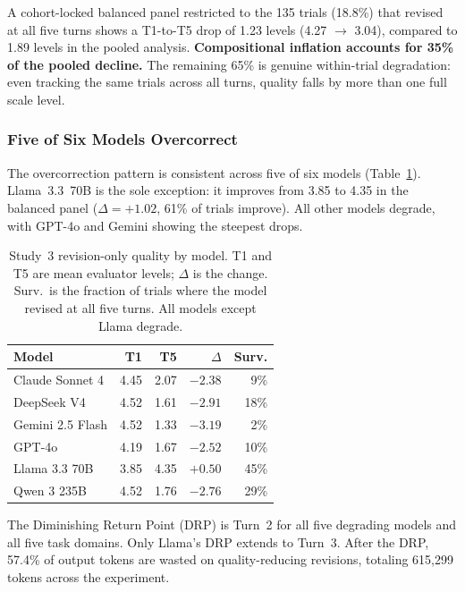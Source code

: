 A cohort-locked balanced panel restricted to the 135 trials (18.8\%) that revised at all five turns shows a T1-to-T5 drop of 1.23 levels (4.27 $\to$ 3.04), compared to 1.89 levels in the pooled analysis. \textbf{Compositional inflation accounts for 35\% of the pooled decline.} The remaining 65\% is genuine within-trial degradation: even tracking the same trials across all turns, quality falls by more than one full scale level.

\subsubsection{Five of Six Models Overcorrect}

The overcorrection pattern is consistent across five of six models (Table~\ref{tab:s3-model-comparison}). Llama~3.3~70B is the sole exception: it improves from 3.85 to 4.35 in the balanced panel ($\Delta = +1.02$, 61\% of trials improve). All other models degrade, with GPT-4o and Gemini showing the steepest drops.

\begin{table}[t]
\centering
\small
\begin{tabular}{@{}lrrrr@{}}
\toprule
\textbf{Model} & \textbf{T1} & \textbf{T5} & \textbf{$\Delta$} & \textbf{Surv.} \\
\midrule
Claude Sonnet 4 & 4.45 & 2.07 & $-2.38$ & 9\% \\
DeepSeek V4 & 4.52 & 1.61 & $-2.91$ & 18\% \\
Gemini 2.5 Flash & 4.52 & 1.33 & $-3.19$ & 2\% \\
GPT-4o & 4.19 & 1.67 & $-2.52$ & 10\% \\
Llama 3.3 70B & 3.85 & 4.35 & $+0.50$ & 45\% \\
Qwen 3 235B & 4.52 & 1.76 & $-2.76$ & 29\% \\
\bottomrule
\end{tabular}
\caption{Study~3 revision-only quality by model. T1 and T5 are mean evaluator levels; $\Delta$ is the change. Surv.\ is the fraction of trials where the model revised at all five turns. All models except Llama degrade.}
\label{tab:s3-model-comparison}
\end{table}

The Diminishing Return Point (DRP) is Turn~2 for all five degrading models and all five task domains. Only Llama's DRP extends to Turn~3. After the DRP, 57.4\% of output tokens are wasted on quality-reducing revisions, totaling 615,299 tokens across the experiment.

